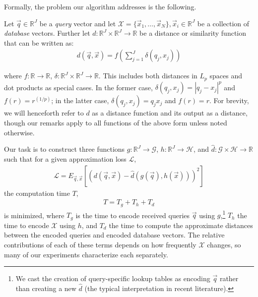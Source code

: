 Formally, the problem our algorithm addresses is the following.

Let $\vec{q} \in \mathbb{R}^J$ be a \textit{query} vector and let $\mathcal{X} = \{\vec{x}_1,\ldots,\vec{x}_N\}, \vec{x}_i \in \mathbb{R}^J$ be a collection of \textit{database} vectors. Further let $d: \mathbb{R}^J \times \mathbb{R}^J \rightarrow \mathbb{R}$ be a distance or similarity function that can be written as:
\begin{align} \label{eq:distFuncForm}
        d(\vec{q}, \vec{x}) = f(\sum_{j=1}^J \delta(q_j, x_j))
\end{align}


where $f: \mathbb{R} \rightarrow \mathbb{R}$, $\delta: \mathbb{R}^J \times \mathbb{R}^J \rightarrow \mathbb{R}$. This includes both distances in $L_p$ spaces and dot products as special cases. In the former case, $\delta(q_j, x_j) = |q_j - x_j|^p$ and $f(r) = r^{(1/p)}$; in the latter case, $\delta(q_j, x_j) = q_j x_j$ and $f(r) = r$. For brevity, we will henceforth refer to $d$ as a distance function and its output as a distance, though our remarks apply to all functions of the above form unless noted otherwise.

Our task is to construct three functions $g: \mathbb{R}^J \rightarrow \mathcal{G}$, $h: \mathbb{R}^J \rightarrow \mathcal{H}$, and $\hat{d}: \mathcal{G} \times \mathcal{H} \rightarrow \mathbb{R}$ such that for a given approximation loss $\mathcal{L}$,
\begin{align}
    \mathcal{L} = E_{\vec{q},\vec{x}}[(d(\vec{q}, \vec{x}) - \hat{d}(g(\vec{q}), h(\vec{x})))^2]
\end{align}
the computation time $T$,
\begin{align}
    T = T_g + T_h + T_d
\end{align}
is minimized, where $T_g$ is the time to encode received queries $\vec{q}$ using $g$,\footnote{We cast the creation of query-specific lookup tables as encoding $\vec{q}$ rather than creating a new $\hat{d}$ (the typical interpretation in recent literature).} $T_h$ the time to encode $\mathcal{X}$ using $h$, and $T_d$ the time to compute the approximate distances between the encoded queries and encoded database vectors. The relative contributions of each of these terms depends on how frequently $\mathcal{X}$ changes, so many of our experiments characterize each separately. %


